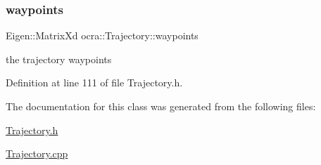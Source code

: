 \subsubsection{\texorpdfstring{waypoints}{waypoints}}
{\footnotesize\ttfamily Eigen\+::\+Matrix\+Xd ocra\+::\+Trajectory\+::waypoints\hspace{0.3cm}{\ttfamily [protected]}}

the trajectory waypoints 

Definition at line 111 of file Trajectory.\+h.



The documentation for this class was generated from the following files\+:\begin{DoxyCompactItemize}
\item 
\hyperlink{Trajectory_8h}{Trajectory.\+h}\item 
\hyperlink{Trajectory_8cpp}{Trajectory.\+cpp}\end{DoxyCompactItemize}
